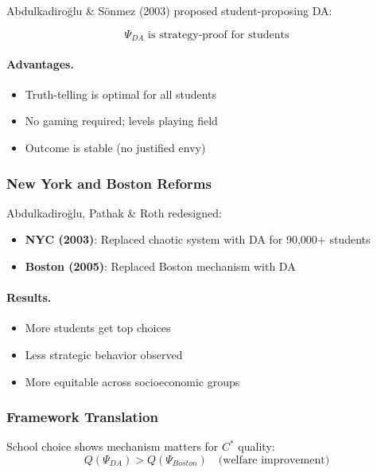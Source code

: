 Abdulkadiroğlu \& Sönmez (2003) proposed student-proposing DA:

\begin{equation}
\boxed{
\Psi_{DA} \text{ is strategy-proof for students}
}
\label{eq:school-da}
\end{equation}

\paragraph{Advantages.}
\begin{itemize}
    \item Truth-telling is optimal for all students
    \item No gaming required; levels playing field
    \item Outcome is stable (no justified envy)
\end{itemize}

\subsubsection{New York and Boston Reforms}

Abdulkadiroğlu, Pathak \& Roth redesigned:
\begin{itemize}
    \item \textbf{NYC (2003)}: Replaced chaotic system with DA for 90,000+ students
    \item \textbf{Boston (2005)}: Replaced Boston mechanism with DA
\end{itemize}

\paragraph{Results.}
\begin{itemize}
    \item More students get top choices
    \item Less strategic behavior observed
    \item More equitable across socioeconomic groups
\end{itemize}

\subsubsection{Framework Translation}

School choice shows mechanism matters for $C^*$ quality:
\begin{equation}
Q(\Psi_{DA}) > Q(\Psi_{Boston}) \quad \text{(welfare improvement)}
\end{equation}

